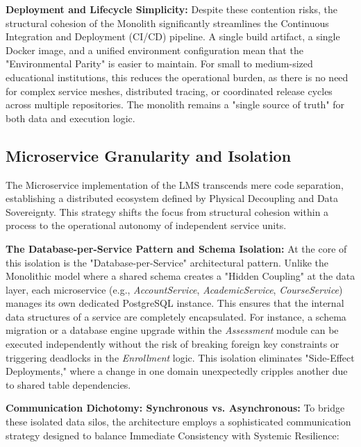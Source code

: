 \textbf{Deployment and Lifecycle Simplicity:}
Despite these contention risks, the structural cohesion of the Monolith significantly streamlines the Continuous Integration and Deployment (CI/CD) pipeline. A single build artifact, a single Docker image, and a unified environment configuration mean that the "Environmental Parity" is easier to maintain. For small to medium-sized educational institutions, this reduces the operational burden, as there is no need for complex service meshes, distributed tracing, or coordinated release cycles across multiple repositories. The monolith remains a "single source of truth" for both data and execution logic.

\subsection{Microservice Granularity and Isolation}
The Microservice implementation of the LMS transcends mere code separation, establishing a distributed ecosystem defined by Physical Decoupling and Data Sovereignty. This strategy shifts the focus from structural cohesion within a process to the operational autonomy of independent service units.

\textbf{The Database-per-Service Pattern and Schema Isolation:}
At the core of this isolation is the "Database-per-Service" architectural pattern. Unlike the Monolithic model where a shared schema creates a "Hidden Coupling" at the data layer, each microservice (e.g., \textit{AccountService}, \textit{AcademicService}, \textit{CourseService}) manages its own dedicated PostgreSQL instance. This ensures that the internal data structures of a service are completely encapsulated. For instance, a schema migration or a database engine upgrade within the \textit{Assessment} module can be executed independently without the risk of breaking foreign key constraints or triggering deadlocks in the \textit{Enrollment} logic. This isolation eliminates "Side-Effect Deployments," where a change in one domain unexpectedly cripples another due to shared table dependencies.

\textbf{Communication Dichotomy: Synchronous vs. Asynchronous:}
To bridge these isolated data silos, the architecture employs a sophisticated communication strategy designed to balance Immediate Consistency with Systemic Resilience:

